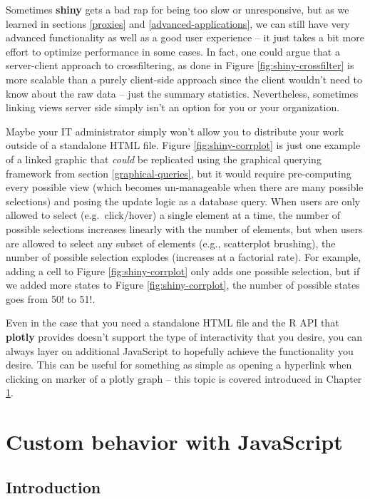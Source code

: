 \documentclass[
  12pt,
]{krantz}
\begin{document}
Sometimes \textbf{shiny} gets a bad rap for being too slow or unresponsive, but as we learned in sections \ref{proxies} and \ref{advanced-applications}, we can still have very advanced functionality as well as a good user experience -- it just takes a bit more effort to optimize performance in some cases. In fact, one could argue that a server-client approach to crossfiltering, as done in Figure \ref{fig:shiny-crossfilter} is more scalable than a purely client-side approach since the client wouldn't need to know about the raw data -- just the summary statistics. Nevertheless, sometimes linking views server side simply isn't an option for you or your organization.

Maybe your IT administrator simply won't allow you to distribute your work outside of a standalone HTML file. Figure \ref{fig:shiny-corrplot} is just one example of a linked graphic that \emph{could} be replicated using the graphical querying framework from section \ref{graphical-queries}, but it would require pre-computing every possible view (which becomes un-manageable when there are many possible selections) and posing the update logic as a database query. When users are only allowed to select (e.g.~click/hover) a single element at a time, the number of possible selections increases linearly with the number of elements, but when users are allowed to select any subset of elements (e.g., scatterplot brushing), the number of possible selection explodes (increases at a factorial rate). For example, adding a cell to Figure \ref{fig:shiny-corrplot} only adds one possible selection, but if we added more states to Figure \ref{fig:shiny-corrplot}, the number of possible states goes from 50! to 51!.

Even in the case that you need a standalone HTML file and the R API that \textbf{plotly} provides doesn't support the type of interactivity that you desire, you can always layer on additional JavaScript to hopefully achieve the functionality you desire. This can be useful for something as simple as opening a hyperlink when clicking on marker of a plotly graph -- this topic is covered introduced in Chapter \ref{javascript}.

\hypertarget{part-custom-behavior-with-javascript}{%
\part{Custom behavior with JavaScript}\label{part-custom-behavior-with-javascript}}

\hypertarget{javascript}{%
\chapter{Introduction}\label{javascript}}
\end{document}
